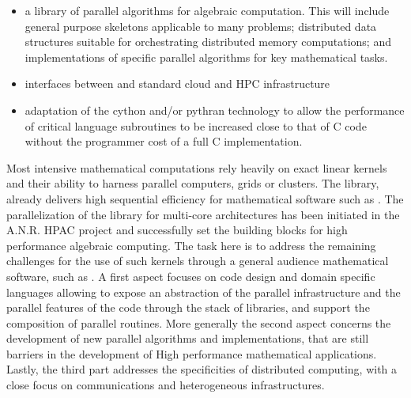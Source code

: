 \begin{workpackage}
\begin{tasklist}
\begin{task}[title=GAP,id=hpc-gap]
\begin{itemize}
\item a library of parallel algorithms for algebraic computation. This
  will include general purpose skeletons applicable to many problems;
  distributed data structures suitable for orchestrating distributed
  memory computations; and implementations of specific parallel algorithms for key
  mathematical tasks.  
\item interfaces between \GAP and standard cloud and HPC
  infrastructure 
\item adaptation of the cython and/or pythran technology to allow the
  performance of critical \GAP language subroutines to be increased
  close to that of C code without the programmer cost of a full C implementation.
\end{itemize}
\end{task}

\begin{task}[title=Linbox,id=hpc-linbox]
Most intensive mathematical computations rely heavily on exact linear kernels
and their ability to harness parallel computers, grids or clusters. The \Linbox
library, already delivers high sequential efficiency for mathematical software
such as \Sage. The parallelization of the library for multi-core architectures
has been initiated in the A.N.R. HPAC project and successfully set the building
blocks for high performance algebraic computing. 
The task here is to  address the remaining challenges for the use of such
kernels through a general audience mathematical software, such as \Sage.
A first aspect focuses on code design and domain specific languages allowing to
expose an abstraction of the parallel infrastructure and the parallel features
of the code through the stack of libraries, and support the
composition of parallel routines.  More generally the second aspect concerns the
development of new parallel algorithms and implementations, that are still
barriers in the development of High performance mathematical
applications. Lastly, the third part addresses the specificities of  distributed
computing, with a close focus on communications and heterogeneous infrastructures.


\end{task}
\end{tasklist}
\end{workpackage}
